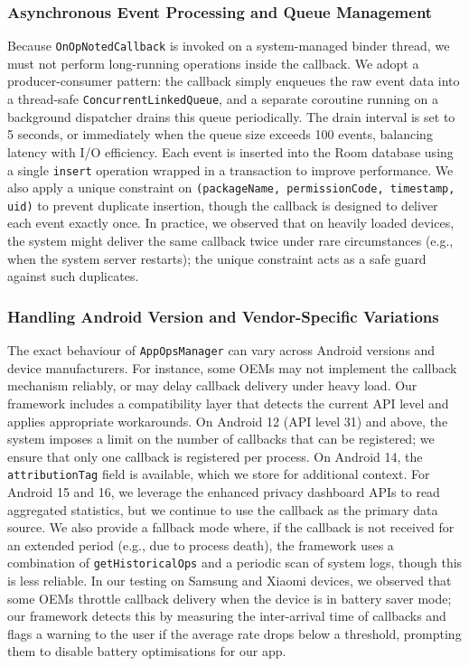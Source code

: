 \subsubsection{Asynchronous Event Processing and Queue Management}

Because \texttt{OnOpNotedCallback} is invoked on a system-managed binder thread, we must not perform long-running operations inside the callback. We adopt a producer-consumer pattern: the callback simply enqueues the raw event data into a thread-safe \texttt{ConcurrentLinkedQueue}, and a separate coroutine running on a background dispatcher drains this queue periodically. The drain interval is set to 5 seconds, or immediately when the queue size exceeds 100 events, balancing latency with I/O efficiency. Each event is inserted into the Room database using a single \texttt{insert} operation wrapped in a transaction to improve performance. We also apply a unique constraint on \texttt{(packageName, permissionCode, timestamp, uid)} to prevent duplicate insertion, though the callback is designed to deliver each event exactly once. In practice, we observed that on heavily loaded devices, the system might deliver the same callback twice under rare circumstances (e.g., when the system server restarts); the unique constraint acts as a safe guard against such duplicates.

\subsubsection{Handling Android Version and Vendor-Specific Variations}

The exact behaviour of \texttt{AppOpsManager} can vary across Android versions and device manufacturers. For instance, some OEMs may not implement the callback mechanism reliably, or may delay callback delivery under heavy load. Our framework includes a compatibility layer that detects the current API level and applies appropriate workarounds. On Android 12 (API level 31) and above, the system imposes a limit on the number of callbacks that can be registered; we ensure that only one callback is registered per process. On Android 14, the \texttt{attributionTag} field is available, which we store for additional context. For Android 15 and 16, we leverage the enhanced privacy dashboard APIs to read aggregated statistics, but we continue to use the callback as the primary data source. We also provide a fallback mode where, if the callback is not received for an extended period (e.g., due to process death), the framework uses a combination of \texttt{getHistoricalOps} and a periodic scan of system logs, though this is less reliable. In our testing on Samsung and Xiaomi devices, we observed that some OEMs throttle callback delivery when the device is in battery saver mode; our framework detects this by measuring the inter-arrival time of callbacks and flags a warning to the user if the average rate drops below a threshold, prompting them to disable battery optimisations for our app.

